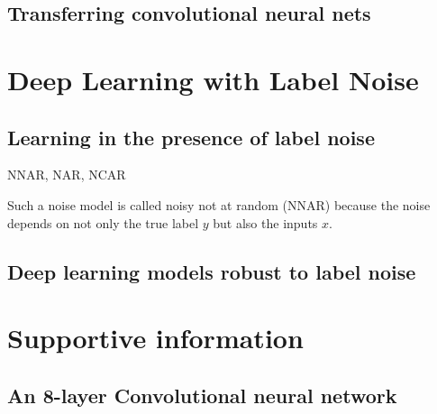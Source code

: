 \subsection{Transferring convolutional neural nets}


\section{Deep Learning with Label Noise}
\subsection{Learning in the presence of label noise}

NNAR, NAR, NCAR

Such a noise model is called noisy not at random (NNAR) \cite{frenay2014classification} because the noise depends on not only the true label $y$ but also the inputs $x$.

\subsection{Deep learning models robust to label noise}


\section{Supportive information}
\label{sec:support}

\subsection{An 8-layer Convolutional neural network}


